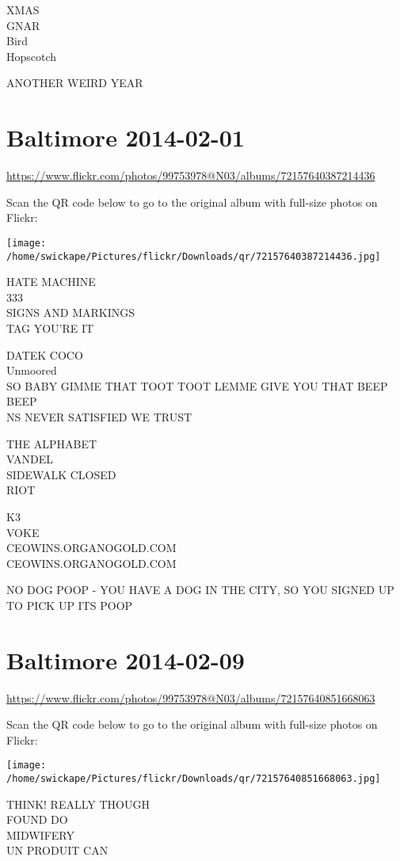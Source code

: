 \documentclass[10pt,letterpaper]{article}
\begin{document}
XMAS\\
GNAR\\
Bird\\
Hopscotch

ANOTHER WEIRD YEAR


\section*{Baltimore 2014-02-01}

\url{https://www.flickr.com/photos/99753978@N03/albums/72157640387214436}

Scan the QR code below to go to the original album with full-size photos on Flickr:

\texttt{[image: /home/swickape/Pictures/flickr/Downloads/qr/72157640387214436.jpg]}


HATE MACHINE\\
333\\
SIGNS AND MARKINGS\\
TAG YOU'RE IT

DATEK COCO\\
Unmoored\\
SO BABY GIMME THAT TOOT TOOT LEMME GIVE YOU THAT BEEP BEEP\\
NS NEVER SATISFIED WE TRUST

THE ALPHABET\\
VANDEL\\
SIDEWALK CLOSED\\
RIOT

K3\\
VOKE\\
CEOWINS.ORGANOGOLD.COM\\
CEOWINS.ORGANOGOLD.COM

NO DOG POOP {-} YOU HAVE A DOG IN THE CITY, SO YOU SIGNED UP TO PICK UP ITS POOP


\section*{Baltimore 2014-02-09}

\url{https://www.flickr.com/photos/99753978@N03/albums/72157640851668063}

Scan the QR code below to go to the original album with full-size photos on Flickr:

\texttt{[image: /home/swickape/Pictures/flickr/Downloads/qr/72157640851668063.jpg]}


THINK!  REALLY THOUGH\\
FOUND DO\\
MIDWIFERY\\
UN PRODUIT CAN
\end{document}
